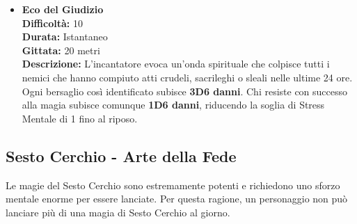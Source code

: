 \documentclass[../manuale_main.tex]{subfiles}
\begin{document}
\begin{itemize}
\vspace{0.5cm}\rule{\textwidth}{0.4pt}\vspace{1cm}

\item \textbf{Eco del Giudizio} \\
\textbf{Difficoltà:} 10 \\
\textbf{Durata:} Istantaneo \\
\textbf{Gittata:} 20 metri \\
\textbf{Descrizione:} L’incantatore evoca un’onda spirituale che colpisce tutti i nemici che hanno compiuto atti crudeli, sacrileghi o sleali nelle ultime 24 ore. Ogni bersaglio così identificato subisce \textbf{3D6 danni}. Chi resiste con successo alla magia subisce comunque \textbf{1D6 danni}, riducendo la soglia di Stress Mentale di 1 fino al riposo.







\end{itemize}

\clearpage
 \subsection*{Sesto Cerchio - Arte della Fede}

Le magie del Sesto Cerchio sono estremamente potenti e richiedono uno sforzo mentale enorme per essere lanciate. Per questa ragione, un personaggio non può lanciare più di una magia di Sesto Cerchio al giorno.
\end{document}
